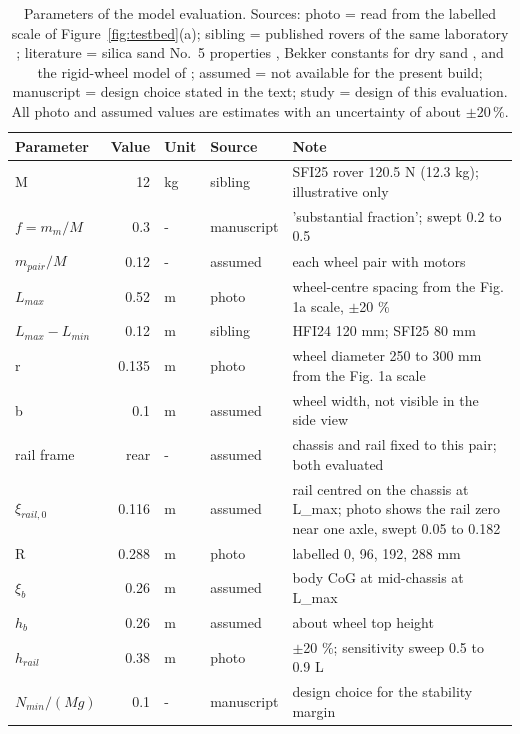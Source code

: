 \begin{table}[!ht]
\centering
\caption{Parameters of the model evaluation. Sources: photo = read from the labelled scale of Figure~\ref{fig:testbed}(a); sibling = published rovers of the same laboratory \citep{HFI24,SFI25}; literature = silica sand No.~5 properties \citep{SFI25}, Bekker constants for dry sand \citep{Wo08}, and the rigid-wheel model of \citet{WR67}; assumed = not available for the present build; manuscript = design choice stated in the text; study = design of this evaluation. All photo and assumed values are estimates with an uncertainty of about $\pm 20\,\%$.\\}
\label{tab:evalparams}
\small
\setlength{\tabcolsep}{4pt}
\begin{tabularx}{\linewidth}{@{}l r l l X@{}}
\toprule
\textbf{Parameter} & \textbf{Value} & \textbf{Unit} & \textbf{Source} & \textbf{Note} \\
\midrule
M & 12 & kg & sibling & SFI25 rover 120.5 N (12.3 kg); illustrative only \\
$f = m_m/M$ & 0.3 & - & manuscript & 'substantial fraction'; swept 0.2 to 0.5 \\
$m_{pair}/M$ & 0.12 & - & assumed & each wheel pair with motors \\
$L_{max}$ & 0.52 & m & photo & wheel-centre spacing from the Fig. 1a scale, $\pm$20 \% \\
$L_{max}-L_{min}$ & 0.12 & m & sibling & HFI24 120 mm; SFI25 80 mm \\
r & 0.135 & m & photo & wheel diameter 250 to 300 mm from the Fig. 1a scale \\
b & 0.1 & m & assumed & wheel width, not visible in the side view \\
rail frame & rear & - & assumed & chassis and rail fixed to this pair; both evaluated \\
$\xi_{rail,0}$ & 0.116 & m & assumed & rail centred on the chassis at L\_max; photo shows the rail zero near one axle, swept 0.05 to 0.182 \\
R & 0.288 & m & photo & labelled 0, 96, 192, 288 mm \\
$\xi_b$ & 0.26 & m & assumed & body CoG at mid-chassis at L\_max \\
$h_b$ & 0.26 & m & assumed & about wheel top height \\
$h_{rail}$ & 0.38 & m & photo & $\pm$20 \%; sensitivity sweep 0.5 to 0.9 L \\
$N_{min}/(Mg)$ & 0.1 & - & manuscript & design choice for the stability margin \\

\end{tabularx}
\end{table}
